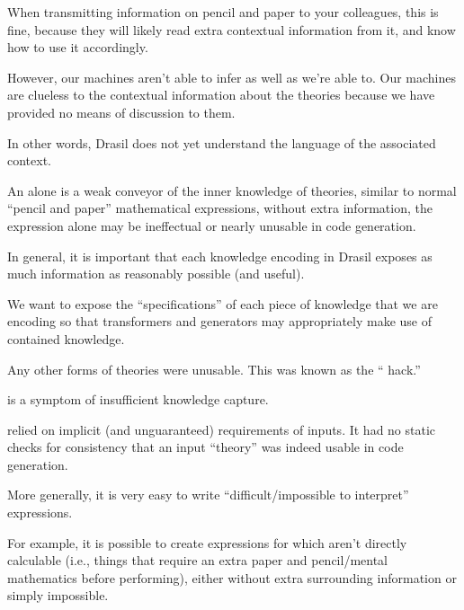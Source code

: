When transmitting information on pencil and paper to your colleagues, this is
fine, because they will likely read extra contextual information from it, and
know how to use it accordingly.

However, our machines aren't able to infer as well as we're able to. Our
machines are clueless to the contextual information about the theories because
we have provided no means of discussion to them.

In other words, Drasil does not yet understand the language of the associated
context.







An \Expr{} alone is a weak conveyor of the inner knowledge of theories, similar
to normal ``pencil and paper'' mathematical expressions, without extra
information, the expression alone may be ineffectual or nearly unusable in code
generation.








In general, it is important that each knowledge encoding in Drasil exposes as
much information as reasonably possible (and useful).

We want to expose the ``specifications'' of each piece of knowledge that we are
encoding so that transformers and generators may appropriately make use of
contained knowledge.

Any other forms of theories were unusable. This was known as the ``\relToQD{}
hack.''

 is a symptom of insufficient knowledge capture.

\relToQD{} relied on implicit (and unguaranteed) requirements of inputs. It had
no static checks for consistency that an input ``theory'' was indeed usable in
code generation.











More generally, it is very easy to write ``difficult/impossible to interpret''
expressions.

For example, it is possible to create expressions for which aren't directly
calculable (i.e., things that require an extra paper and pencil/mental
mathematics before performing), either without extra surrounding information or
simply impossible.







